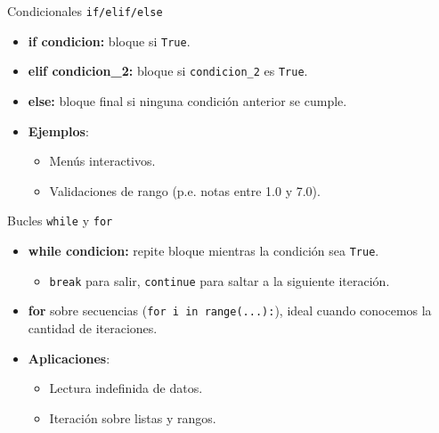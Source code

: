\documentclass[10pt]{beamer}
\begin{document}
\begin{frame}{Condicionales \texttt{if/elif/else}}
  \begin{itemize}
    \item \textbf{if condicion:} bloque si \texttt{True}.
    \item \textbf{elif condicion\_2:} bloque si \texttt{condicion\_2} es \texttt{True}.
    \item \textbf{else:} bloque final si ninguna condición anterior se cumple.
    \item \textbf{Ejemplos}:
\begin{itemize}
  \item Menús interactivos.
  \item Validaciones de rango (p.e. notas entre 1.0 y 7.0).
\end{itemize}
  \end{itemize}
\end{frame}

\begin{frame}{Bucles \texttt{while} y \texttt{for}}
  \begin{itemize}
    \item \textbf{while condicion:} repite bloque mientras la condición sea \texttt{True}.
      \begin{itemize}
        \item \texttt{break} para salir, \texttt{continue} para saltar a la siguiente iteración.
      \end{itemize}
    \item \textbf{for} sobre secuencias (\texttt{for i in range(...):}), ideal cuando conocemos la cantidad de iteraciones.
    \item \textbf{Aplicaciones}:
      \begin{itemize}
        \item Lectura indefinida de datos.
        \item Iteración sobre listas y rangos.
      \end{itemize}
  \end{itemize}
\end{frame}
\end{document}
